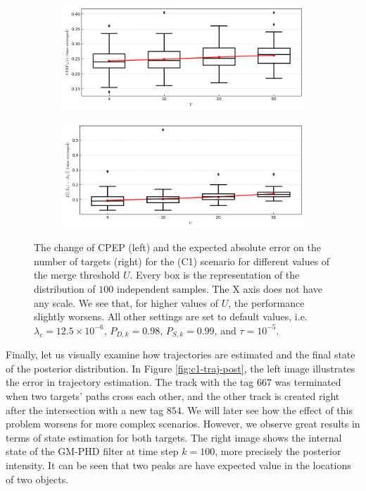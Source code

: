 \begin{figure}
    \centering
    \begin{subfigure}[]{0.48\linewidth}
        \centering
        \includegraphics[width=\linewidth]{figures/c1-merge-cpep.png}
    \end{subfigure}
    \hfill
    \begin{subfigure}[]{0.48\linewidth}
        \centering
        \includegraphics[width=\linewidth]{figures/c1-merge-eae.png}
    \end{subfigure}
  \caption[(C1). Change of performance depending on the merge threshold.]{The change of CPEP (left) and the expected absolute error on the number of targets (right) for the (C1) scenario for different values of the merge threshold $U$. Every box is the representation of the distribution of $100$ independent samples. The X axis does not have any scale. We see that, for higher values of $U$, the performance slightly worsens. All other settings are set to default values, i.e. $\lambda_{c} = 12.5 \times 10^{-6}$, $P_{D,k} = 0.98$, $P_{S,k} = 0.99$, and $\tau = 10^{-5}$.}
  \label{fig:c1-u}
\end{figure}

Finally, let us visually examine how trajectories are estimated and the final state of the posterior distribution. In Figure \ref{fig:c1-traj-post}, the left image illustrates the error in trajectory estimation. The track with the tag $667$ was terminated when two targets' paths cross each other, and the other track is created right after the intersection with a new tag $854$. We will later see how the effect of this problem worsens for more complex scenarios. However, we observe great results in terms of state estimation for both targets. The right image shows the internal state of the GM-PHD filter at time step $k=100$, more precisely the posterior intensity. It can be seen that two peaks are have expected value in the locations of two objects.

